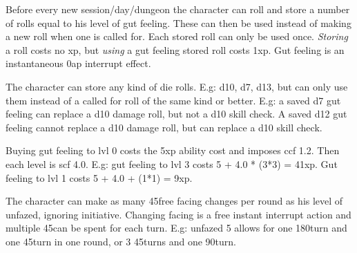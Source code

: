  Before every new session/day/dungeon the character can roll and store a number of rolls equal to his level of gut feeling. These can then be used instead of making a new roll when one is called for. Each stored roll can only be used once. \emph{Storing} a roll costs no xp, but \emph{using} a gut feeling stored roll costs 1xp. Gut feeling is an instantaneous 0ap interrupt effect.

The character can store any kind of die rolls. E.g: d10, d7, d13, but can only use them instead of a called for roll of the same kind or better. E.g: a saved d7 gut feeling can replace a d10 damage roll, but not a d10 skill check. A saved d12 gut feeling cannot replace a d10 damage roll, but can replace a d10 skill check.

Buying gut feeling to lvl 0 costs the 5xp ability cost and imposes ccf 1.2. Then each level is scf 4.0. E.g: gut feeling to lvl 3 costs 5 + 4.0 * (3*3) = 41xp. Gut feeling to lvl 1 costs 5 + 4.0 + (1*1) = 9xp.



 The character can make as many 45\degrees free facing changes per round as his level of unfazed, ignoring initiative. Changing facing is a free instant interrupt action and multiple 45\degrees can be spent for each turn. E.g: unfazed 5 allows for one 180\degrees turn and one 45\degrees turn in one round, or 3 45\degrees turns and one 90\degrees turn.







\closeskillslist















